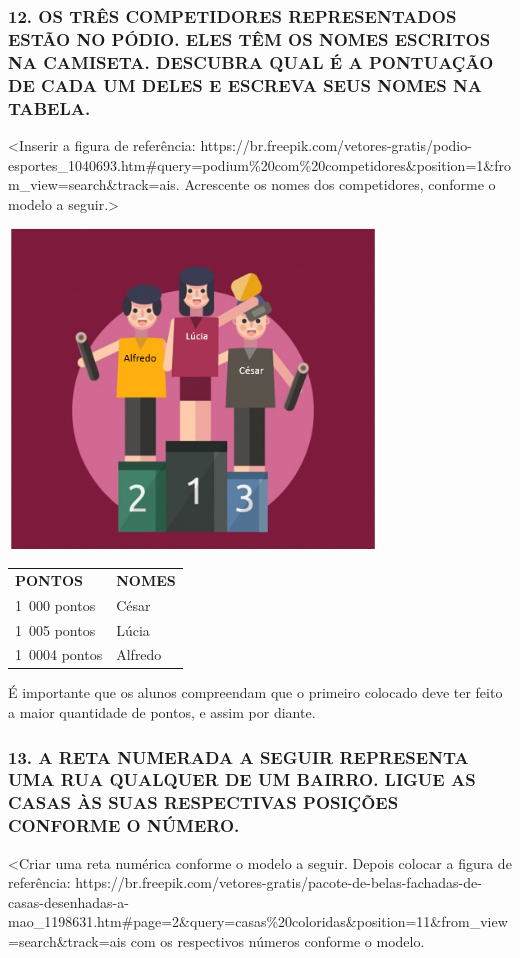 \subsubsection{12. OS TRÊS COMPETIDORES REPRESENTADOS ESTÃO NO PÓDIO. ELES TÊM OS NOMES ESCRITOS NA CAMISETA. DESCUBRA QUAL É A PONTUAÇÃO DE CADA UM DELES E ESCREVA SEUS NOMES NA TABELA.}\label{section}

\textless{}Inserir a figura de referência:
https://br.freepik.com/vetores-gratis/podio-esportes\_1040693.htm\#query=podium\%20com\%20competidores\&position=1\&from\_view=search\&track=ais.
Acrescente os nomes dos competidores, conforme o modelo a
seguir.\textgreater{}

\includegraphics[width=3.84950in,height=3.34590in]{media/image9.png}

\begin{longtable}[]{@{}ll@{}}
\toprule
\textbf{PONTOS} & \textbf{NOMES}\tabularnewline
1~000 pontos & César\tabularnewline
1~005 pontos & Lúcia\tabularnewline
1~0004 pontos & Alfredo\tabularnewline
\bottomrule
\end{longtable}

É importante que os alunos compreendam que o primeiro
colocado deve ter feito a maior quantidade de pontos, e assim por
diante.

\subsubsection{13. A RETA NUMERADA A SEGUIR REPRESENTA UMA RUA QUALQUER DE UM BAIRRO. LIGUE AS CASAS ÀS SUAS RESPECTIVAS POSIÇÕES CONFORME O NÚMERO.}\label{section-1}

\textless{}Criar uma reta numérica conforme o modelo a seguir. Depois
colocar a figura de referência:
https://br.freepik.com/vetores-gratis/pacote-de-belas-fachadas-de-casas-desenhadas-a-mao\_1198631.htm\#page=2\&query=casas\%20coloridas\&position=11\&from\_view=search\&track=ais
com os respectivos números conforme o modelo.

